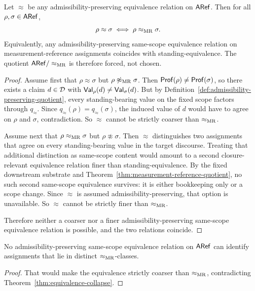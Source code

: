 \begin{theorem}
\label{thm:equivalence-collapse}
Let $\approx$ be any admissibility-preserving equivalence relation on $\mathsf{ARef}$. Then for all
$\rho,\sigma\in\mathsf{ARef}$,
\[
\rho \approx \sigma \iff \rho \mathrel{\approx_{\mathrm{MR}}} \sigma.
\]
Equivalently, any admissibility-preserving same-scope equivalence relation on measurement-reference
assignments coincides with standing-equivalence. The quotient $\mathsf{ARef}/\mathrel{\approx_{\mathrm{MR}}}$ is therefore forced,
not chosen.
\end{theorem}

\begin{proof}
Assume first that $\rho \approx \sigma$ but $\rho \not\mathrel{\approx_{\mathrm{MR}}} \sigma$. Then
$\mathsf{Prof}(\rho)\neq \mathsf{Prof}(\sigma)$, so there exists a claim $d\in\mathcal{D}$ with
$\mathsf{Val}_\rho(d)\neq \mathsf{Val}_\sigma(d)$. But by Definition~\ref{def:admissibility-preserving-quotient},
every standing-bearing value on the fixed scope factors through $q_{\approx}$. Since
$q_{\approx}(\rho)=q_{\approx}(\sigma)$, the induced value of $d$ would have to agree on
$\rho$ and $\sigma$, contradiction. So $\approx$ cannot be strictly coarser than $\mathrel{\approx_{\mathrm{MR}}}$.

Assume next that $\rho \mathrel{\approx_{\mathrm{MR}}} \sigma$ but $\rho \not\approx \sigma$. Then $\approx$ distinguishes two
assignments that agree on every standing-bearing value in the target discourse. Treating that
additional distinction as same-scope content would amount to a second closure-relevant equivalence
relation finer than standing-equivalence. By the fixed downstream substrate and
Theorem~\ref{thm:measurement-reference-quotient}, no such second same-scope equivalence survives:
it is either bookkeeping only or a scope change. Since $\approx$ is assumed admissibility-preserving,
that option is unavailable. So $\approx$ cannot be strictly finer than $\mathrel{\approx_{\mathrm{MR}}}$.

Therefore neither a coarser nor a finer admissibility-preserving same-scope equivalence relation is
possible, and the two relations coincide.
\end{proof}

\begin{corollary}
\label{cor:no-coarser-equivalence}
No admissibility-preserving same-scope equivalence relation on $\mathsf{ARef}$ can identify assignments that
lie in distinct $\mathrel{\approx_{\mathrm{MR}}}$-classes.
\end{corollary}

\begin{proof}
That would make the equivalence strictly coarser than $\mathrel{\approx_{\mathrm{MR}}}$, contradicting
Theorem~\ref{thm:equivalence-collapse}.
\end{proof}

